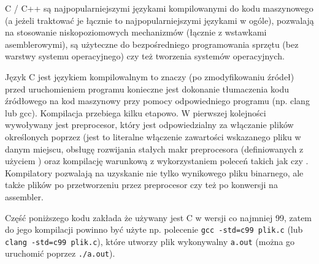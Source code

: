 % 
% 
% 
% 

C / C++ są najpopularniejszymi językami kompilowanymi do kodu maszynowego (a jeżeli traktować je łącznie to najpopularniejszymi językami w ogóle), pozwalają na stosowanie niskopoziomowych mechanizmów (łącznie z wstawkami asemblerowymi), są użyteczne do bezpośredniego programowania sprzętu (bez warstwy systemu operacyjnego) czy też tworzenia systemów operacyjnych.

Język C jest językiem kompilowalnym to znaczy (po zmodyfikowaniu źródeł) przed uruchomieniem programu konieczne jest dokonanie tłumaczenia kodu źródłowego na kod maszynowy przy pomocy odpowiedniego programu (np. clang lub gcc). Kompilacja przebiega kilku etapowo. W pierwszej kolejności wywoływany jest preprocesor, który jest odpowiedzialny za włączanie plików określonych poprzez  (jest to literalne włączenie zawartości wskazanego pliku w danym miejscu, obsługę rozwijania stałych makr preprocesora (definiowanych z użyciem ) oraz kompilację warunkową z wykorzystaniem poleceń takich jak  czy . Kompilatory pozwalają na uzyskanie nie tylko wynikowego pliku binarnego, ale także plików po przetworzeniu przez preprocesor czy też po konwersji na assembler.

Część poniższego kodu zakłada że używany jest C w wersji co najmniej 99, zatem do jego kompilacji powinno być użyte np. polecenie \Verb#gcc -std=c99 plik.c# (lub \Verb#clang -std=c99 plik.c#), które utworzy plik wykonywalny \Verb#a.out# (można go uruchomić poprzez \Verb#./a.out#).
